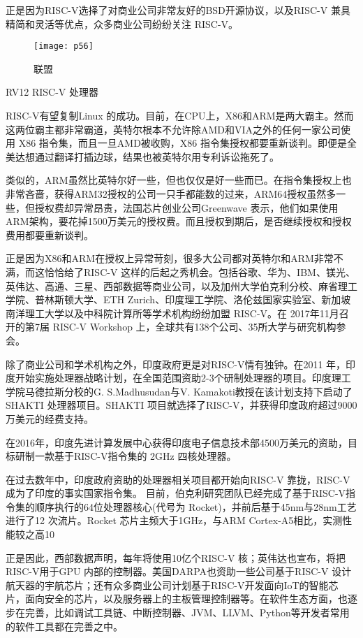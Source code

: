 \documentclass[utf8]{book}
\begin{document}
正是因为RISC-V选择了对商业公司非常友好的BSD开源协议，以及RISC-V 兼具精简和灵活等优点，众多商业公司纷纷关注 RISC-V。

	\begin{figure}[H]
	\centering
	\texttt{[image: p56]}
	\caption{联盟}
	\end{figure}

{\LARGE RV12 RISC-V 处理器}

RISC-V有望复制Linux 的成功。目前，在CPU上，X86和ARM是两大霸主。然而这两位霸主都非常霸道，英特尔根本不允许除AMD和VIA之外的任何一家公司使用 X86 指令集，而且一旦AMD被收购，X86 指令集授权都要重新谈判。即便是全美达想通过翻译打插边球，结果也被英特尔用专利诉讼拖死了。

类似的，ARM虽然比英特尔好一些，但也仅仅是好一些而已。在指令集授权上也非常吝啬，获得ARM32授权的公司一只手都能数的过来，ARM64授权虽然多一些，但授权费却异常昂贵，法国芯片创业公司Greenwave 表示，他们如果使用ARM架构，要花掉1500万美元的授权费。而且授权到期后，是否继续授权和授权费用都要重新谈判。

正是因为X86和ARM在授权上异常苛刻，很多大公司都对英特尔和ARM非常不满，而这恰恰给了RISC-V 这样的后起之秀机会。包括谷歌、华为、IBM、镁光、英伟达、高通、三星、西部数据等商业公司，以及加州大学伯克利分校、麻省理工学院、普林斯顿大学、ETH Zurich、印度理工学院、洛伦兹国家实验室、新加坡南洋理工大学以及中科院计算所等学术机构纷纷加盟 RISC-V。在 2017年11月召开的第7届 RISC-V Workshop 上，全球共有138个公司、35所大学与研究机构参会。

除了商业公司和学术机构之外，印度政府更是对RISC-V情有独钟。在2011 年，印度开始实施处理器战略计划，在全国范围资助2-3个研制处理器的项目。印度理工学院马德拉斯分校的G. S.Madhusudan与V. Kamakoti教授在该计划支持下启动了SHAKTI 处理器项目。SHAKTI 项目就选择了RISC-V，并获得印度政府超过9000万美元的经费支持。

在2016年，印度先进计算发展中心获得印度电子信息技术部4500万美元的资助，目标研制一款基于RISC-V指令集的 2GHz 四核处理器。

在过去数年中，印度政府资助的处理器相关项目都开始向RISC-V 靠拢，RISC-V 成为了印度的事实国家指令集。
目前，伯克利研究团队已经完成了基于RISC-V指令集的顺序执行的64位处理器核心(代号为 Rocket)，并前后基于45nm与28nm工艺进行了12 次流片。Rocket 芯片主频大于1GHz，与ARM Cortex-A5相比，实测性能较之高10%

正是因此，西部数据声明，每年将使用10亿个RISC-V 核；英伟达也宣布，将把RISC-V用于GPU 内部的控制器。美国DARPA也资助一些公司基于RISC-V 设计航天器的宇航芯片；还有众多商业公司计划基于RISC-V开发面向IoT的智能芯片，面向安全的芯片，以及服务器上的主板管理控制器等。在软件生态方面，也逐步在完善，比如调试工具链、中断控制器、JVM、LLVM、Python等开发者常用的软件工具都在完善之中。
\end{document}
